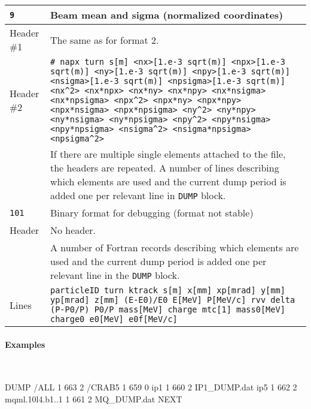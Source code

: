 \begin{center}
\begin{longtable}{|p{1.8cm}|p{13.8cm}|}
        \hline
        \rowcolor{blue!15}
        \texttt{9} & Beam mean and sigma (normalized coordinates) \\
        \hline
        Header \#1 & The same as for format 2.\\
        \hline
        Header \#2 & \texttt{\# napx turn s[m] <nx>[1.e-3 sqrt(m)] <npx>[1.e-3 sqrt(m)] <ny>[1.e-3 sqrt(m)] <npy>[1.e-3 sqrt(m)] <nsigma>[1.e-3 sqrt(m)] <npsigma>[1.e-3 sqrt(m)] <nx\^{}2> <nx*npx> <nx*ny> <nx*npy> <nx*nsigma> <nx*npsigma> <npx\^{}2> <npx*ny> <npx*npy> <npx*nsigma> <npx*npsigma> <ny\^{}2> <ny*npy> <ny*nsigma> <ny*npsigma> <npy\^{}2> <npy*nsigma> <npy*npsigma> <nsigma\^{}2> <nsigma*npsigma> <npsigma\^{}2>}\vspace{1mm}\\
                   & If there are multiple single elements attached to the file, the headers are repeated. A number of lines describing which elements are used and the current dump period is added one per relevant line in \texttt{DUMP} block.\\
        \hline
        \rowcolor{blue!15}
        \texttt{101} & Binary format for debugging (format not stable) \\
        \hline
        Header & No header.\vspace{1mm}\\
               & A number of Fortran records describing which elements are used and the current dump period is added one per relevant line in the \texttt{DUMP} block.\\
        \hline
        Lines  & \texttt{particleID turn ktrack s[m] x[mm] xp[mrad] y[mm] yp[mrad] z[mm] (E-E0)/E0  E[MeV] P[MeV/c] rvv delta (P-P0/P) P0/P mass[MeV] charge mtc[1] mass0[MeV] charge0 e0[MeV] e0f[MeV/c] } \\
       \end{longtable}
\end{center}

\paragraph{Examples}~
\begin{cverbatim}
DUMP
/ALL 1 663 2
/CRAB5 1 659 0
ip1 1 660 2 IP1_DUMP.dat
ip5 1 662 2
mqml.10l4.b1..1 1 661 2 MQ_DUMP.dat
NEXT
\end{cverbatim}

